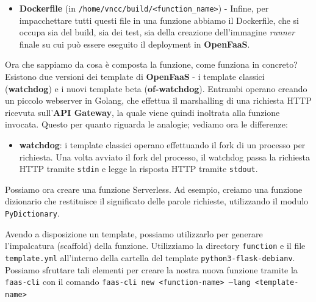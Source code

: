 \documentclass[11pt, a4paper]{article}
\begin{document}
\begin{itemize}[noitemsep]
\begin{itemize}[noitemsep]
        \item \textbf{Definisce una directory come package Python} Questo è il suo scopo fondamentale. Se osservi la struttura, nella cartella \texttt{test/} sono presenti i file \texttt{handler.py} e \texttt{requirements.txt}. Per consentire al sistema di importare il codice come se fosse una libreria (ad esempio, utilizzando \texttt{import test} o \texttt{from test import handler}), Python deve trovare un file \texttt{\_\_init\_\_.py} in tale directory. È sufficiente un file vuoto per segnalare "questa cartella è un package".
        \item Di fatto, senza questo file, l'engine di \textbf{OpenFaaS} (\textbf{of-watchdog}) non sarebbe in grado di individuare e caricare la funzione \texttt{handle} scritta in \texttt{handler.py}.
    \end{itemize}
    \item \textbf{Dockerfile} (in \texttt{/home/vncc/build/<function\_name>}) - Infine, per impacchettare tutti questi file in una funzione abbiamo il Dockerfile, che si occupa sia del build, sia dei test, sia della creazione dell'immagine \emph{runner} finale su cui può essere eseguito il deployment in \textbf{OpenFaaS}.
\end{itemize}


Ora che sappiamo da cosa è composta la funzione, come funziona in concreto? Esistono due versioni dei template di \textbf{OpenFaaS} - i template classici (\textbf{watchdog}) e i nuovi template beta (\textbf{of-watchdog}). Entrambi operano creando un piccolo webserver in Golang, che effettua il marshalling di una richiesta HTTP ricevuta sull'\textbf{API Gateway}, la quale viene quindi inoltrata alla funzione invocata. Questo per quanto riguarda le analogie; vediamo ora le differenze:
\begin{itemize}[noitemsep]
    \item \textbf{watchdog}: i template classici operano effettuando il fork di un processo per richiesta. Una volta avviato il fork del processo, il watchdog passa la richiesta HTTP tramite \texttt{stdin} e legge la risposta HTTP tramite \texttt{stdout}.
\end{itemize}

Possiamo ora creare una funzione Serverless. Ad esempio, creiamo una funzione dizionario che restituisce il significato delle parole richieste, utilizzando il modulo \texttt{PyDictionary}.

Avendo a disposizione un template, possiamo utilizzarlo per generare l'impalcatura (scaffold) della funzione. Utilizziamo la directory \texttt{function} e il file \texttt{template.yml} all'interno della cartella del template \texttt{python3-flask-debianv}. Possiamo sfruttare tali elementi per creare la nostra nuova funzione tramite la \texttt{faas-cli} con il comando \texttt{faas-cli new <function-name> --lang <template-name>}
\end{document}
